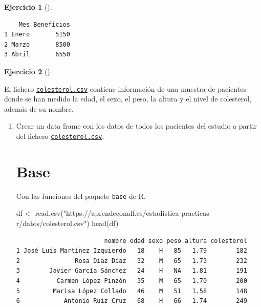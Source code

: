 \documentclass[
  spanish,
  a4paper,
]{scrreport}
\newenvironment{Shaded}{\begin{snugshade}}{\end{snugshade}}
\newcommand{\FunctionTok}[1]{\textcolor[rgb]{0.28,0.35,0.67}{#1}}
\newcommand{\NormalTok}[1]{\textcolor[rgb]{0.00,0.23,0.31}{#1}}
\newcommand{\OtherTok}[1]{\textcolor[rgb]{0.00,0.23,0.31}{#1}}
\newcommand{\StringTok}[1]{\textcolor[rgb]{0.13,0.47,0.30}{#1}}
\theoremstyle{definition}
\newtheorem{exercise}{Ejercicio}[chapter]
\theoremstyle{remark}
\begin{document}
\begin{exercise}[]
\begin{enumerate}
\begin{tcolorbox}
\begin{verbatim}
    Mes Beneficios
1 Enero       5150
2 Marzo       8500
3 Abril       6550
\end{verbatim}

  \end{tcolorbox}
\end{enumerate}

\end{exercise}

\begin{exercise}[]\protect\hypertarget{exr-preprocesamiento-2}{}\label{exr-preprocesamiento-2}

El fichero \href{datos/colesterol.csv}{\texttt{colesterol.csv}} contiene
información de una muestra de pacientes donde se han medido la edad, el
sexo, el peso, la altura y el nivel de colesterol, además de su nombre.

\begin{enumerate}
\def\labelenumi{\alph{enumi}.}
\item
  Crear un data frame con los datos de todos los pacientes del estudio a
  partir del fichero
  \href{datos/colesterol.csv}{\texttt{colesterol.csv}}.

  \begin{tcolorbox}[enhanced jigsaw, titlerule=0mm, arc=.35mm, rightrule=.15mm, opacitybacktitle=0.6, leftrule=.75mm, colframe=quarto-callout-tip-color-frame, toptitle=1mm, breakable, colbacktitle=quarto-callout-tip-color!10!white, bottomrule=.15mm, colback=white, left=2mm, bottomtitle=1mm, opacityback=0, title=\textcolor{quarto-callout-tip-color}{\faLightbulb}\hspace{0.5em}{Solución}, toprule=.15mm, coltitle=black]

  \section{Base}

  Con las funciones del paquete \texttt{base} de R.

\begin{Shaded}
\begin{Highlighting}[]
\NormalTok{df }\OtherTok{\textless{}{-}} \FunctionTok{read.csv}\NormalTok{(}\StringTok{"https://aprendeconalf.es/estadistica{-}practicas{-}r/datos/colesterol.csv"}\NormalTok{)}
\FunctionTok{head}\NormalTok{(df)}
\end{Highlighting}
\end{Shaded}

\begin{verbatim}
                        nombre edad sexo peso altura colesterol
1 José Luis Martínez Izquierdo   18    H   85   1.79        182
2               Rosa Díaz Díaz   32    M   65   1.73        232
3        Javier García Sánchez   24    H   NA   1.81        191
4          Carmen López Pinzón   35    M   65   1.70        200
5         Marisa López Collado   46    M   51   1.58        148
6            Antonio Ruiz Cruz   68    H   66   1.74        249
\end{verbatim}


\end{tcolorbox}
\end{enumerate}
\end{exercise}
\end{document}

